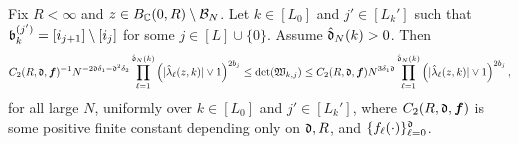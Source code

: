 \documentclass{amsart}
\numberwithin{equation}{section}
\def\corEE{\textcolor{amethyst}}
\def\corEE{}
\def\corAB{}
\begin{document}
\begin{lemma}\label{lem:det-W-bd}
Fix $R<\infty$ and $z \in B_{\mathbb{C}}(0,R) \setminus \mathcal{B}_N$. Let $k \in [L_0]$ and $j' \in [L_k']$ such that $\mathfrak{b}_k^{(j')}= [i_{j+1}] \setminus [i_j]$ for some $j \in [L] \cup\{0\}$. Assume $\hat{\mathfrak{d}}_N(k) >0$. Then
\[
  C_2(R,\gd, {\bm f})^{-1} N^{-\corEE{2\gd \delta_1 - \gd^2 \delta_2  }}
  \prod_{\ell=1}^{\corAB{\hat\gd_N(k)}} \left( |\hat{\lambda}_\ell (z,k)| \vee 1\right)^{2b_j}
  \le \det(\mathfrak{W}_{k,j})
  \le C_2(R,\gd, {\bm f}) N^{{3\delta_1\gd}}
  \prod_{\ell=1}^{\corAB{\hat\gd_N(k)}} \left(|\hat{\lambda}_\ell(z,k) | \vee 1\right)^{2b_j},
\]
for all large $N$, uniformly over $k \in [L_0]$ and $j' \in [L_k']$, where $C_2(R,\mathfrak{d}, {\bm f})$ is some positive finite constant depending only on $\mathfrak{d}, R$, and $\{f_\ell(\cdot)\}_{\ell=0}^{\mathfrak{d}}$.
\end{lemma}
\end{document}
